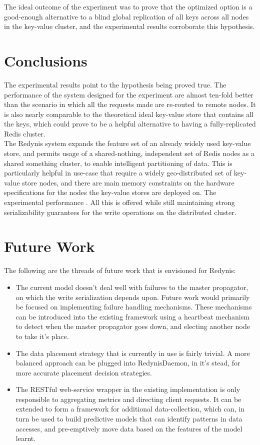 \documentclass{sig-alternate}
\begin{document}
The ideal outcome of the experiment was to prove that the optimized option is a good-enough alternative to a blind global replication of all keys across all nodes in the key-value cluster, and the experimental results corroborate this hypothesis.\\


\section{Conclusions}
The experimental results point to the hypothesis being proved true. The performance of the system designed for the experiment are almost ten-fold better than the scenario in which all the requests made are re-routed to remote nodes. It is also nearly comparable to the theoretical ideal key-value store that contains all the keys, which could prove to be a helpful alternative to having a fully-replicated Redis cluster.\\

The Redynis system expands the feature set of an already widely used key-value store, and permits usage of a shared-nothing, independent set of Redis nodes as a shared something cluster, to enable intelligent partitioning of data. This is particularly helpful in use-case that require a widely geo-distributed set of key-value store nodes, and there are main memory constraints on the hardware specifications for the nodes the key-value stores are deployed on. The experimental performance . All this is offered while still maintaining strong serializability guarantees for the write operations on the distributed cluster.\\


\section{Future Work}
The following are the threads of future work that is envisioned for Redynis:

\begin{itemize}
	\item The current model doesn't deal well with failures to the master propagator, on which the write serialization depends upon. Future work would primarily be focused on implementing failure handling mechanisms. These mechanisms can be introduced into the existing framework using a heartbeat mechanism to detect when the master propagator goes down, and electing another node to take it's place.
	\item The data placement strategy that is currently in use is fairly trivial. A more balanced approach can be plugged into RedynisDaemon, in it's stead, for more accurate placement decision strategies.
	\item The RESTful web-service wrapper in the existing implementation is only responsible to aggregating metrics and directing client requests. It can be extended to form a framework for additional data-collection, which can, in turn be used to build predictive models that can identify patterns in data accesses, and pre-emptively move data based on the features of the model learnt.
\end{itemize}
\end{document}

